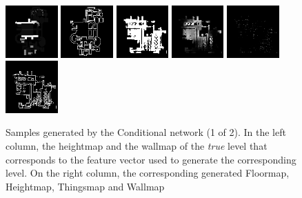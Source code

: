 \begin{figure}[h!]
\begin{minipage}[b]{\linewidth}
	\begin{center}
		\includegraphics[width=2cm]{figures/results/samples/cond/sample11_map_heightmap_true.png}
		\includegraphics[width=2cm]{figures/results/samples/cond/sample11_map_wallmap_true.png}
		\hfill 
		\includegraphics[width=2cm]{figures/results/samples/cond/sample11_map_floormap_generated.png}
		\includegraphics[width=2cm]{figures/results/samples/cond/sample11_map_heightmap_generated.png}
		\includegraphics[width=2cm]{figures/results/samples/cond/sample11_map_thingsmap_generated.png}
		\includegraphics[width=2cm]{figures/results/samples/cond/sample11_map_wallmap_generated.png}
	\end{center}
	

	\end{minipage}
\caption[Samples Generated by the Conditional network (1 of 2)]{Samples generated by the Conditional network (1 of 2). In the left column, the heightmap and the wallmap of the \textit{true} level that corresponds to the feature vector used to generate the corresponding level. On the right column, the corresponding generated Floormap, Heightmap, Thingsmap and Wallmap}
\end{figure}

